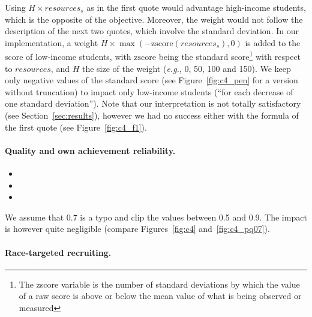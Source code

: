 Using $H \times resources_s$ as in the first quote would advantage high-income students, which is the opposite of the objective. Moreover, the weight would not follow the description of the next two quotes, which involve the standard deviation. In our implementation, a weight $H \times \max(-\mathrm{zscore}({resources}_s), 0)$ is added to the score of low-income students, with $\mathrm{zscore}$ being the standard score\footnote{The zscore variable is the number of standard deviations by which the value of a raw score is above or below the mean value of what is being observed or measured} with respect to $resources$, and $H$ the size of the weight (\emph{e.g.}, 0, 50, 100 and 150).
We keep only negative values of the standard score (see Figure~\ref{fig:c4_pen} for a version without truncation) to impact only low-income students (``for each decrease of one standard
deviation'').
Note that our interpretation is not totally satisfactory (see Section~\ref{sec:results}), however we had no success either with the formula of the first quote (see Figure~\ref{fig:c4_f1}).

\paragraph{Quality and own achievement reliability.}

\begin{itemize}

\item{}

\item{}

\item{}

\end{itemize}

We assume that 0.7 is a typo and clip the values between 0.5 and 0.9. The impact is however quite negligible (compare  Figures~\ref{fig:c4} and~\ref{fig:c4_pq07}).

\paragraph{Race-targeted recruiting.}

